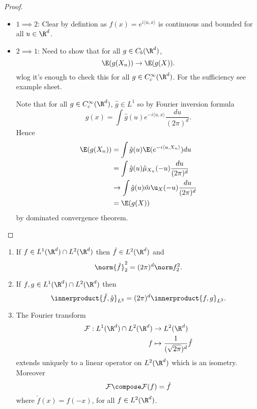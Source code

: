 \documentclass[a4paper]{article}
\newcommand*{\ip}{\innerproduct} %
\begin{document}
\begin{proof}\leavevmode
  \begin{itemize}
  \item \(1 \implies 2\): Clear by defintion as \(f(x) = e^{i \langle u, x \rangle}\) is continuous and bounded for all \(u \in \R^d\).
  \item \(2 \implies 1\): Need to show that for all \(g \in C_b(\R^d)\),
    \[
      \E(g(X_n)) \to \E(g(X)).
    \]
    wlog it's enough to check this for all \(g \in C_c^\infty(\R^d)\). For the sufficiency see example sheet.

    Note that for all \(g \in C_c^\infty(\R^d)\), \(\hat g \in L^1\) so by Fourier inversion formula
    \[
      g(x) = \int \hat g(u) e^{-i \langle u, x\rangle} \frac{du}{(2\pi)^d}.
    \]
    Hence
    \begin{align*}
      \E(g(X_n))
      &= \int \hat g(u) \E(e^{-i \langle u, X_n \rangle}) du \\
      &= \int \hat g(u) \hat \mu_{X_n} (-u) \frac{du}{(2\pi)^d} \\
      &\to \int \hat g(u) \hat m\u_X(-u) \frac{du}{(2\pi)^d} \\
      &= \E(g(X))
    \end{align*}
    by dominated convergence theorem.
  \end{itemize}
\end{proof}


\begin{theorem}\leavevmode
  \begin{enumerate}
  \item If \(f \in L^1(\R^d) \cap L^2(\R^d)\) then \(\hat f \in L^2(\R^d)\) and
    \[
      \norm{\hat f}^2_2 = (2\pi)^d \norm f^2_2.
    \]
  \item If \(f, g \in L^1(\R^d) \cap L^2(\R^d)\) then
    \[
      \ip{\hat f, \hat g}_{L^2} = (2\pi)^d \ip{f, g}_{L^2}.
    \]
  \item The Fourier transform
    \begin{align*}
      \mathcal F: L^1(\R^d) \cap L^2(\R^d) &\to L^2(\R^d) \\
      f &\mapsto \frac{1}{(\sqrt{2\pi})^d} \hat f
    \end{align*}
    extends uniquely to a linear operator on \(L^2(\R^d)\) which is an isometry. Moreover
    \[
      \mathcal F \compose \mathcal F (f) = \check f
    \]
    where \(\check f(x) = f(-x)\), for all \(f \in L^2(\R^d)\).
  \end{enumerate}
\end{theorem}
\end{document}
